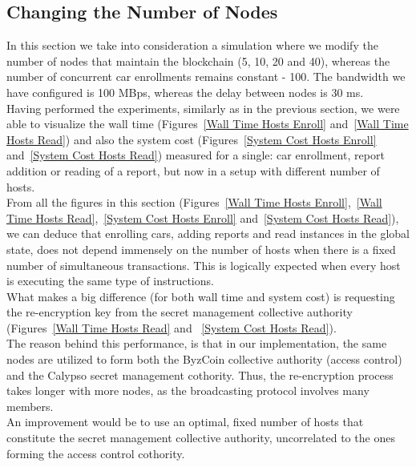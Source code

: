 \subsection{Changing the Number of Nodes}

In this section we take into consideration a simulation where we modify the number of nodes that maintain the blockchain (5, 10, 20 and 40), whereas the number of concurrent car enrollments remains constant - 100.  The bandwidth we have configured is 100 MBps, whereas the delay between nodes is 30 ms.\\
\newline
Having performed the experiments, similarly as in the previous section, we were able to visualize the wall time (Figures~\ref{Wall Time Hosts Enroll} and~\ref{Wall Time Hosts Read}) and also the system cost (Figures~\ref{System Cost Hosts Enroll} and~\ref{System Cost Hosts Read}) measured for a single: car enrollment, report addition or reading of a report, but now in a setup with different number of hosts.\\
\newline
From all the figures in this section (Figures~\ref{Wall Time Hosts Enroll},~\ref{Wall Time Hosts Read},~\ref{System Cost Hosts Enroll} and~\ref{System Cost Hosts Read}), we can deduce that enrolling cars, adding reports and read instances in the global state, does not depend immensely on the number of hosts when there is a fixed number of simultaneous transactions. This is logically expected when every host is executing the same type of instructions.\\
\newline
What makes a big difference (for both wall time and system cost) is requesting the re-encryption key from the secret management collective authority (Figures~\ref{Wall Time Hosts Read} and ~\ref{System Cost Hosts Read}).\\
\newline
The reason behind this performance, is that in our implementation, the same nodes are utilized to form both the ByzCoin collective authority (access control) and the Calypso secret management cothority. Thus, the re-encryption process takes longer with more nodes, as the broadcasting protocol involves many members.\\
\newline
An improvement would be to use an optimal, fixed number of hosts that constitute the secret management collective authority, uncorrelated to the ones forming the access control cothority.\\
